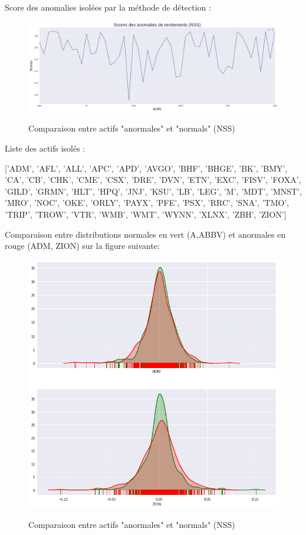 Score des anomalies isolées par la méthode de détection :

\begin{figure}[H]
\centering
\caption{Comparaison entre actifs "anormales" et "normals" (NSS)}
   \includegraphics[scale=0.35]{img/scores_densite_NSS.png}
 \label{anormm1}
\end{figure}

Liste des actifs isolés :

['ADM', 'AFL', 'ALL', 'APC', 'APD', 'AVGO', 'BHF', 'BHGE', 'BK', 'BMY',
       'CA', 'CB', 'CHK', 'CME', 'CSX', 'DRE', 'DVN', 'ETN', 'EXC', 'FISV',
       'FOXA', 'GILD', 'GRMN', 'HLT', 'HPQ', 'JNJ', 'KSU', 'LB', 'LEG', 'M',
       'MDT', 'MNST', 'MRO', 'NOC', 'OKE', 'ORLY', 'PAYX', 'PFE', 'PSX', 'RRC',
       'SNA', 'TMO', 'TRIP', 'TROW', 'VTR', 'WMB', 'WMT', 'WYNN', 'XLNX',
       'ZBH', 'ZION']

Comparaison entre distributions normales en vert (A,ABBV) et anormales en rouge (ADM, ZION) sur la figure suivante:

\begin{figure}[H]
\centering
\caption{Comparaison entre actifs "anormales" et "normals" (NSS)}
   \includegraphics[scale=0.7]{img/anomalie_vs_normal_nss.png}
 \label{anormm}
\end{figure}

